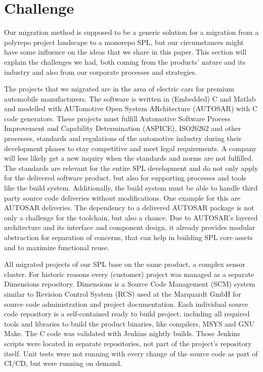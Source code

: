 \section{Challenge}

Our migration method is supposed to be a generic solution for a migration from a
polyrepo project landscape to a monorepo SPL, but our circumstances might have
some influence on the ideas that we share in this paper. This section will
explain the challenges we had, both coming from the products' nature and its
industry and also from our corporate processes and strategies.

The projects that we migrated are in the area of electric cars for premium
automobile manufacturers. The software is written in (Embedded) C and Matlab and
modelled with AUTomotive Open System ARchitecture (AUTOSAR) with C code
generators. These projects must fulfill Automotive Software Process Improvement
and Capability Determination (ASPICE), ISO26262 and other processes, standards
and regulations of the automotive industry during their development phases to
stay competitive and meet legal requirements. A company will less likely get a
new inquiry when the standards and norms are not fulfilled. The standards are
relevant for the entire SPL development and do not only apply for the delivered
software product, but also for supporting processes and tools like the build
system. Additionally, the build system must be able to handle third party source
code deliveries without modifications. One example for this are AUTOSAR
deliveries. The dependency to a delivered AUTOSAR package is not only a
challenge for the toolchain, but also a chance. Due to AUTOSAR's layered
architecture and its interface and component design, it already provides modular
abstraction for separation of concerns, that can help in building SPL core
assets and to maximize functional reuse.

All migrated projects of our SPL base on the same product, a complex sensor
cluster. For historic reasons every (customer) project was managed as a separate
Dimensions repository. Dimensions is a Source Code Management (SCM) system
similar to Revision Control System (RCS) used at the Marquardt GmbH for source
code administration and project documentation. Each individual source code
repository is a self-contained ready to build project, including all required
tools and libraries to build the product binaries, like compilers, MSYS and GNU
Make. The C code was validated with Jenkins nightly builds. Those Jenkins
scripts were located in separate repositories, not part of the project's
repository itself. Unit tests were not running with every change of the source
code as part of CI/CD, but were running on demand.

